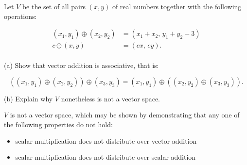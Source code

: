 
\begin{exerciseStatement}


 Let \(V\) be the set of all pairs \((x,y)\) of real numbers together with the following operations: 


\begin{align*} (x_1,y_1)\oplus (x_2,y_2)&= \left(x_{1} + x_{2},\,y_{1} + y_{2} - 3\right)  \\c \odot (x,y) &= \left(c x,\,c y\right) . \\ \end{align*}
            

 (a) Show that vector addition is associative, that is: 

\[\left((x_1,y_1)\oplus(x_2,y_2)\right)\oplus(x_3,y_3)=(x_1,y_1)\oplus\left((x_2,y_2)\oplus(x_3,y_3)\right).
    \]

 (b) Explain why \(V\) nonetheless is not a vector space. 


\end{exerciseStatement}
    
\begin{exerciseAnswer} 


\(V\) is not a vector space, which may be shown by demonstrating that any one of the following properties do not hold: 


\begin{itemize}
\item scalar multiplication does not distribute over vector addition
\item scalar multiplication does not distribute over scalar addition
\end{itemize}
    
\end{exerciseAnswer}
    
